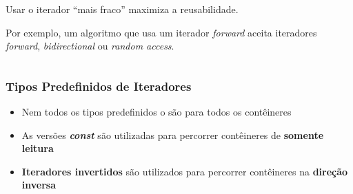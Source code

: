 \documentclass[xcolor={dvipsnames,table},aspectratio=169]{beamer}
\begin{document}
\begin{frame}
\begin{columns}
\begin{column}{0.35\linewidth}
\begin{figure}[h]
\end{figure}
\begin{itemize}
{\small
	\item Usar o iterador ``mais fraco'' maximiza a reusabilidade.
	\item Por exemplo, um algoritmo que usa um iterador \emph{forward} aceita iteradores \emph{forward}, \emph{bidirectional} ou \emph{random access}.
}
\end{itemize}
\end{column}
\end{columns}
\end{frame}

\begin{frame}\frametitle{Tipos Predefinidos de Iteradores}
{\small
\begin{center}
\end{center}
}
\begin{itemize}
	\item Nem todos os tipos predefinidos o são para todos os contêineres
	\item As versões \textbf\emph{const} são utilizadas para percorrer contêineres de \textbf{somente leitura}
	\item \textbf{Iteradores invertidos} são utilizados para percorrer contêineres na \textbf{direção inversa}
\end{itemize}
\end{frame}
\end{document}
